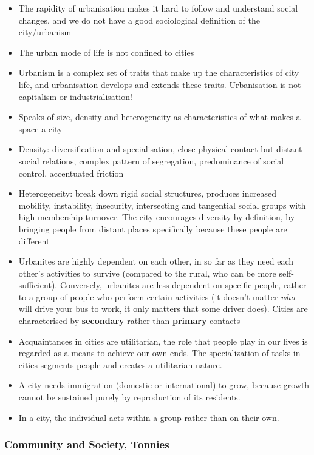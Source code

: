 \documentclass{article}
\begin{document}
\begin{itemize}
  \item The rapidity of urbanisation makes it hard to follow and understand social changes, and we do not have a good sociological definition of the city/urbanism
  \item The urban mode of life is not confined to cities
  \item Urbanism is a complex set of traits that make up the characteristics of city life, and urbanisation develops and extends these traits. Urbanisation is not capitalism or industrialisation!
  \item Speaks of size, density and heterogeneity as characteristics of what makes a space a city
  \item Density: diversification and specialisation, close physical contact but distant social relations, complex pattern of segregation, predominance of social control, accentuated friction
  \item Heterogeneity: break down rigid social structures, produces increased mobility, instability, insecurity, intersecting and tangential social groups with high membership turnover. The city encourages diversity by definition, by bringing people from distant places specifically because these people are different
  \item Urbanites are highly dependent on each other, in so far as they need each other's activities to survive (compared to the rural, who can be more self-sufficient). Conversely, urbanites are less dependent on specific people, rather to a group of people who perform certain activities (it doesn't matter \textit{who} will drive your bus to work, it only matters that some driver does). Cities are characterised by \textbf{secondary} rather than \textbf{primary} contacts
  \item Acquaintances in cities are utilitarian, the role that people play in our lives is regarded as a means to achieve our own ends. The specialization of tasks in cities segments people and creates a utilitarian nature.
  \item A city needs immigration (domestic or international) to grow, because growth cannot be sustained purely by reproduction of its residents. 
  \item In a city, the individual acts within a group rather than on their own.
\end{itemize}

\subsubsection{Community and Society, Tonnies}
\end{document}
